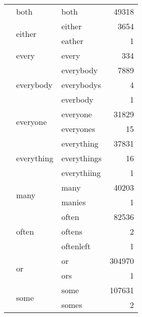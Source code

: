 \begin{longtable}[ht]{lllr}
 & both & both & {\cellcolor[HTML]{FCFED1}} \color[HTML]{000000} 49318 \\
\cline{2-4}
 & \multirow[c]{2}{*}{either} & either & {\cellcolor[HTML]{FFFFD9}} \color[HTML]{000000} 3654 \\
 &  & eather & {\cellcolor[HTML]{FFFFD9}} \color[HTML]{000000} 1 \\
\cline{2-4}
 & every & every & {\cellcolor[HTML]{FFFFD9}} \color[HTML]{000000} 334 \\
\cline{2-4}
 & \multirow[c]{3}{*}{everybody} & everybody & {\cellcolor[HTML]{FEFFD8}} \color[HTML]{000000} 7889 \\
 &  & everybodys & {\cellcolor[HTML]{FFFFD9}} \color[HTML]{000000} 4 \\
 &  & everbody & {\cellcolor[HTML]{FFFFD9}} \color[HTML]{000000} 1 \\
\cline{2-4}
 & \multirow[c]{2}{*}{everyone} & everyone & {\cellcolor[HTML]{FDFED4}} \color[HTML]{000000} 31829 \\
 &  & everyones & {\cellcolor[HTML]{FFFFD9}} \color[HTML]{000000} 15 \\
\cline{2-4}
 & \multirow[c]{3}{*}{everything} & everything & {\cellcolor[HTML]{FDFED4}} \color[HTML]{000000} 37831 \\
 &  & everythings & {\cellcolor[HTML]{FFFFD9}} \color[HTML]{000000} 16 \\
 &  & everythiing & {\cellcolor[HTML]{FFFFD9}} \color[HTML]{000000} 1 \\
\cline{2-4}
 & \multirow[c]{2}{*}{many} & many & {\cellcolor[HTML]{FCFED3}} \color[HTML]{000000} 40203 \\
 &  & manies & {\cellcolor[HTML]{FFFFD9}} \color[HTML]{000000} 1 \\
\cline{2-4}
 & \multirow[c]{3}{*}{often} & often & {\cellcolor[HTML]{F9FDCC}} \color[HTML]{000000} 82536 \\
 &  & oftens & {\cellcolor[HTML]{FFFFD9}} \color[HTML]{000000} 2 \\
 &  & oftenleft & {\cellcolor[HTML]{FFFFD9}} \color[HTML]{000000} 1 \\
\cline{2-4}
 & \multirow[c]{2}{*}{or} & or & {\cellcolor[HTML]{E6F5B2}} \color[HTML]{000000} 304970 \\
 &  & ors & {\cellcolor[HTML]{FFFFD9}} \color[HTML]{000000} 1 \\
\cline{2-4}
 & \multirow[c]{3}{*}{some} & some & {\cellcolor[HTML]{F8FCC9}} \color[HTML]{000000} 107631 \\
 &  & somes & {\cellcolor[HTML]{FFFFD9}} \color[HTML]{000000} 2 \\

\end{longtable}

